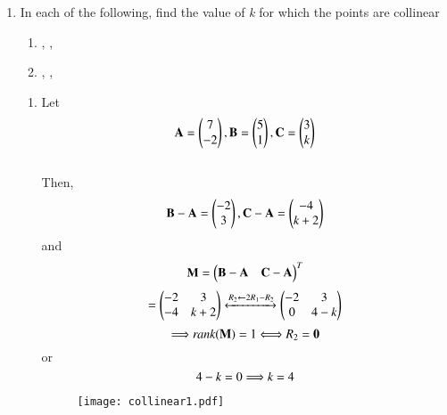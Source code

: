 \documentclass[journal,12pt,twocolumn]{IEEEtran}
\renewcommand\thesection{\arabic{section}}
\begin{document}
\begin{enumerate}[label=\thesection.\arabic*.,ref=\thesection.\theenumi]
\item In each of the following, find the value of \emph{k} for which the points are collinear
\begin{enumerate}
    \item {}, , 
    \item {}, , 
\end{enumerate}
\solution\begin{enumerate}
    \item Let
    \begin{align}
        \vec{A}=\myvec{7\\-2}, \vec{B}=\myvec{5\\1}, \vec{C}=\myvec{3\\k}
    \end{align}\\
    Then,
    \begin{align}
        \vec{B}-\vec{A}=\myvec{-2\\3}, \vec{C}-\vec{A}=\myvec{-4\\\emph{k}+2}
    \end{align}
    and
    \begin{align}
     \vec{M}=\myvec{\vec{B}-\vec{A}&\vec{C}-\vec{A}}^T\end{align}
     \begin{align}
         =\myvec{-2 & 3\\-4 & \emph{k}+2} \xleftrightarrow{R_2 \leftarrow 2R_1-R_2}
     \myvec{-2&3\\0&4-\emph{k}}
     \end{align}
         \[\Longrightarrow \emph{rank}(\vec{M})=1 \Longleftrightarrow R_2 = \vec{0}\]
         or \[4 - \emph{k} = 0 \Longrightarrow \emph{k}=4\]
         \begin{figure}[h]
\centering
\texttt{[image: collinear1.pdf]}
\label{Fig 1.1}
\end{figure}


\end{enumerate}
\end{enumerate}
\end{document}

